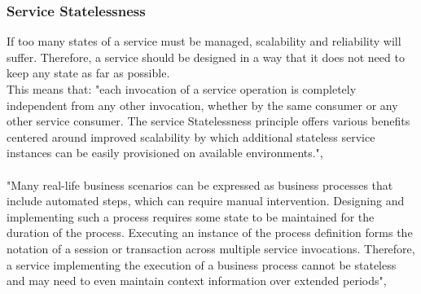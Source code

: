 \documentclass[12pt]{article}
\begin{document}
\subsubsection{Service Statelessness}
If too many states of a service must be managed, scalability and reliability will suffer. Therefore, a service should be designed in a way that it does not need to keep any state as far as possible. \cite[page 88]{te}\\
This means that: "each invocation of a service operation is completely independent from any other invocation, whether by the same consumer or any other service consumer. The service Statelessness principle offers various benefits centered around improved scalability by which additional stateless service instances can be easily provisioned on available environments.", \cite[page 197]{grau}\\
\\
"Many real-life business scenarios can be expressed as business processes that include automated steps, which can require manual intervention. Designing and implementing such a process requires some state to be maintained for the duration of the process. Executing an instance of the process definition forms the notation of a session or transaction across multiple service invocations. Therefore, a service implementing the execution of a business process cannot be stateless and may need to even maintain context information over extended periods",\cite[page 197]{grau}
\end{document}
